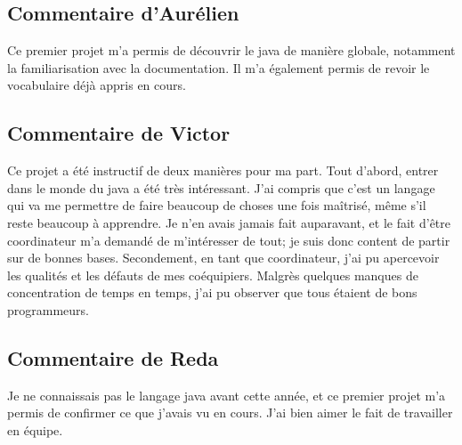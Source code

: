 \documentclass[a4paper,11pts]{article}
\begin{document}
\subsection{Commentaire d'Aurélien}
Ce premier projet m'a permis de découvrir le java de manière globale, notamment la familiarisation avec la documentation. Il m'a également permis de revoir le vocabulaire déjà appris en cours.
\subsection{Commentaire de Victor}
Ce projet a été instructif de deux manières pour ma part. Tout d'abord, entrer dans le monde du java a été très intéressant. J'ai compris que c'est un langage qui va me permettre de faire beaucoup de choses une fois maîtrisé, même s'il reste beaucoup à apprendre. Je n'en avais jamais fait auparavant, et le fait d'être coordinateur m'a demandé de m'intéresser de tout; je suis donc content de partir sur de bonnes bases. Secondement, en tant que coordinateur, j'ai pu apercevoir les qualités et les défauts de mes coéquipiers. Malgrès quelques manques de concentration de temps en temps, j'ai pu observer que tous étaient de bons programmeurs.
\subsection{Commentaire de Reda}
Je ne connaissais pas le langage java avant cette année, et ce premier projet m'a permis de confirmer ce que j'avais vu en cours. J'ai bien aimer le fait de travailler en équipe.
\end{document}
